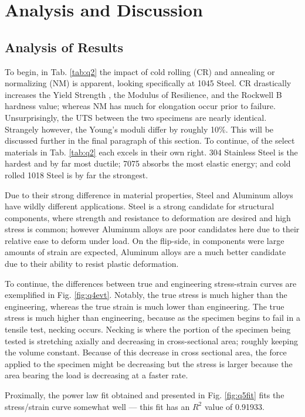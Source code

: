 \documentclass{article}
\begin{document}
\section{Analysis and Discussion}
\subsection{Analysis of Results}

To begin, in Tab. \ref{tab:q2} the impact of cold rolling (CR) and annealing or normalizing (NM) is apparent, looking specifically at 1045 Steel. CR drastically increases the Yield Strength , the Modulus of Resilience, and the Rockwell B hardness value; whereas NM has much for elongation occur prior to failure. Unsurprisingly, the UTS between the two specimens are nearly identical. Strangely however, the Young's moduli differ by roughly 10\%. This will be discussed further in the final paragraph of this section. To continue, of the select materials in Tab. \ref{tab:q2} each excels in their own right. 304 Stainless Steel is the hardest and by far most ductile; 7075 absorbs the most elastic energy; and cold rolled 1018 Steel is by far the strongest. 

Due to their strong difference in material properties, Steel and Aluminum alloys have wildly different applications. Steel is a strong candidate for structural components, where strength and resistance to deformation are desired and high stress is common; however Aluminum alloys are poor candidates here due to their relative ease to deform under load. On the flip-side, in components were large amounts of strain are expected, Aluminum alloys are a much better candidate due to their ability to resist plastic deformation. 

To continue, the differences between true and engineering stress-strain curves are exemplified in Fig. \ref{fig:q4evt}. Notably, the true stress is much higher than the engineering, whereas the true strain is much lower than engineering. The true stress is much higher than engineering, because as the specimen begins to fail in a tensile test, necking occurs. Necking is where the portion of the specimen being tested is stretching axially and decreasing in cross-sectional area; roughly keeping the volume constant. Because of this decrease in cross sectional area, the force applied to the specimen might be decreasing but the stress is larger because the area bearing the load is decreasing at a faster rate. 

Proximally, the power law fit obtained and presented in Fig. \ref{fig:q5fit} fits the stress/strain curve somewhat well --- this fit has an $R^2$ value of 0.91933. 
\end{document}
